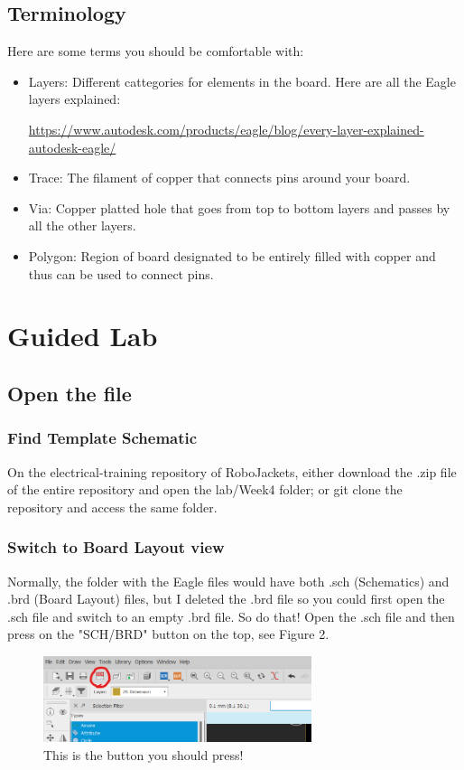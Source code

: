 \documentclass{article}
\begin{document}
\subsection{Terminology}
Here are some terms you should be comfortable with:
\begin{itemize}
\item Layers: Different cattegories for elements in the board. Here are all the Eagle layers explained:

\href{https://www.autodesk.com/products/eagle/blog/every-layer-explained-autodesk-eagle/}{https://www.autodesk.com/products/eagle/blog/every-layer-explained-autodesk-eagle/}

\item Trace: The filament of copper that connects pins around your board.
\item Via: Copper platted hole that goes from top to bottom layers and passes by all the other layers. 
\item Polygon: Region of board designated to be entirely filled with copper and thus can be used to connect pins.
\end{itemize}

\section{Guided Lab}
\subsection{Open the file}
\subsubsection{Find Template Schematic}
On the electrical-training repository of RoboJackets, either download the .zip file of the entire repository and open the lab/Week4 folder; or git clone the repository and access the same folder. 
\subsubsection{Switch to Board Layout view}
Normally, the folder with the Eagle files would have both .sch (Schematics) and .brd (Board Layout) files, but I deleted the .brd file so you could first open the .sch file and switch to an empty .brd file. So do that! Open the .sch file and then press on the "SCH/BRD" button on the top, see Figure 2.

\begin{figure}[ht]
	\center
	\includegraphics[width=0.7\textwidth, keepaspectratio]{images/SCH.png}
	\caption{This is the button you should press!}
	\label{fig:SCH}
\end{figure}
\end{document}
